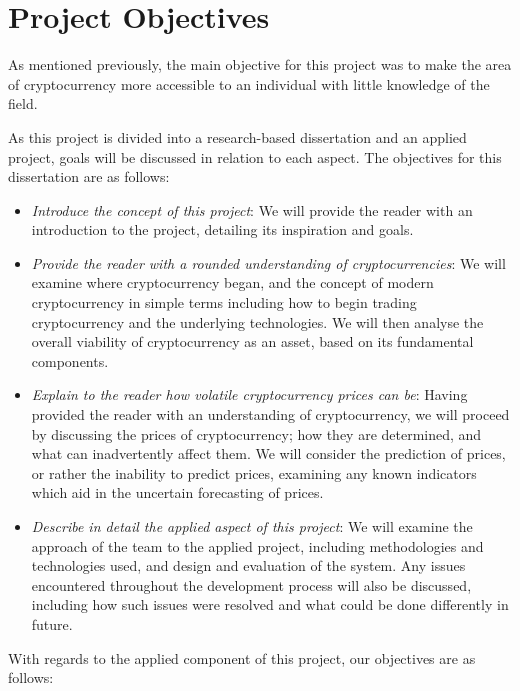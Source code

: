 \section{Project Objectives}\label{objectives}

As mentioned previously, the main objective for this project was to make the area of cryptocurrency more accessible to an individual with little knowledge of the field. 

As this project is divided into a research-based dissertation and an applied project, goals will be discussed in relation to each aspect. The objectives for this dissertation are as follows:

\begin{itemize}
    \item \textit{Introduce the concept of this project}: We will provide the reader with an introduction to the project, detailing its inspiration and goals.
    \item\textit{Provide the reader with a rounded understanding of cryptocurrencies}: We will examine where cryptocurrency began, and the concept of modern cryptocurrency in simple terms including how to begin trading cryptocurrency and the underlying technologies. We will then analyse the overall viability of cryptocurrency as an asset, based on its fundamental components.
    \item\textit{Explain to the reader how volatile cryptocurrency prices can be}: Having provided the reader with an understanding of cryptocurrency, we will proceed by discussing the prices of cryptocurrency; how they are determined, and what can inadvertently affect them. We will consider the prediction of prices, or rather the inability to predict prices, examining any known indicators which aid in the uncertain forecasting of prices.
    \item\textit{Describe in detail the applied aspect of this project}: We will examine the approach of the team to the applied project, including methodologies and technologies used, and design and evaluation of the system. Any issues encountered throughout the development process will also be discussed, including how such issues were resolved and what could be done differently in future.
\end{itemize}

With regards to the applied component of this project, our objectives are as follows:

